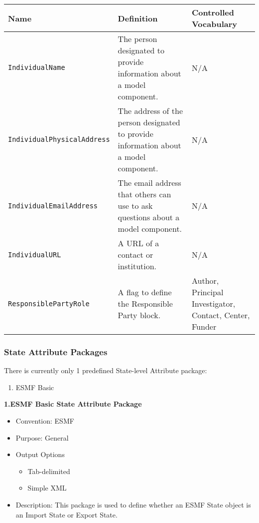 \begin{tabular}{|p{8cm}|p{20cm}|p{10cm}|}
     {\bf Name } & {\bf Definition} & {\bf Controlled Vocabulary} \\
     \hline\hline
     {\tt IndividualName} & The person designated to provide information about a model component. & N/A \\
     {\tt IndividualPhysicalAddress} & The address of the person designated to provide information about a model component. & N/A \\
     {\tt IndividualEmailAddress} & The email address that others can use to ask questions about a model component. & N/A \\
     {\tt IndividualURL} & A URL of a contact or institution. & N/A \\
     {\tt ResponsiblePartyRole} & A flag to define the Responsible Party block. & Author, Principal Investigator, Contact, Center, Funder\\
\end{tabular}



\vspace{.25in}
\subsubsection{State Attribute Packages}
\label{StateAttributePackages}

There is currently only 1 predefined State-level Attribute package:

\begin{enumerate}
    \item ESMF Basic
\end{enumerate}



\vspace{.25in}
{\bf 1.ESMF Basic State Attribute Package}

\begin{itemize}
    \item Convention: ESMF
    \item Purpose: General
    \item Output Options
    \begin{itemize}
        \item Tab-delimited
        \item Simple XML 
    \end{itemize}
    \item Description: This package is used to define whether an ESMF State object is an Import State or Export State.   
\end{itemize}

